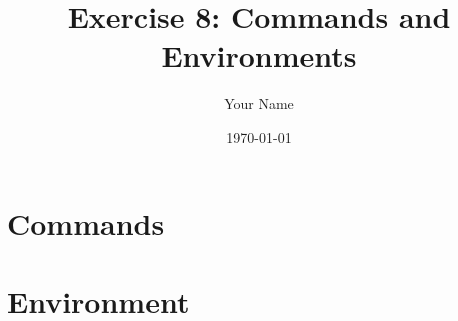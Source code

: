 \documentclass{article}
\title{Exercise 8: Commands and Environments}
\author{Your Name}
\date{\today}
\begin{document}
\maketitle

\section{Commands}

\section{Environment}
\end{document}
